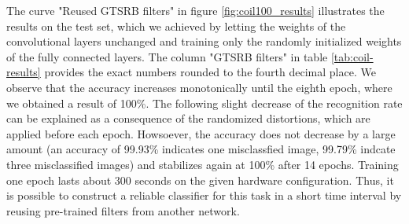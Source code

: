\documentclass[11pt, a4paper]{article}
\begin{document}
The curve "Reused GTSRB filters" in figure \ref{fig:coil100_results} illustrates the results on the test set, which we achieved by letting the weights of the convolutional layers unchanged and training only the randomly initialized weights of the fully connected layers. The column "GTSRB filters" in table \ref{tab:coil-results} provides the exact numbers rounded to the fourth decimal place. We observe that the accuracy increases monotonically until the eighth epoch, where we obtained a result of 100\%. The following slight decrease of the recognition rate can be explained as a consequence of the randomized distortions, which are applied before each epoch. Howsoever, the accuracy does not decrease by a large amount (an accuracy of 99.93\% indicates one misclassfied image, 99.79\% indcate three misclassified images) and stabilizes again at 100\% after 14 epochs. Training one epoch lasts about 300 seconds on the given hardware configuration. Thus, it is possible to construct a reliable classifier for this task in a short time interval by reusing pre-trained filters from another network.%
\end{document}
